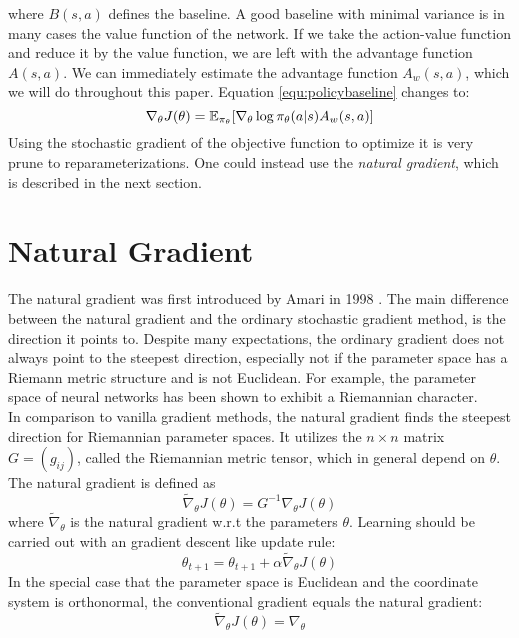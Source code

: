 where $B(s, a)$ defines the baseline. A good baseline with minimal variance is in many cases the value function of the network. If we take the action-value function and reduce it by the value function, we are left with the advantage function $A(s,a)$. We can immediately estimate the advantage function $A_w(s,a)$, which we will do throughout this paper. Equation \ref{equ:policybaseline} changes to:
\begin{equation}
	\nabla_{\theta}J(\theta)=\operatorname{\mathbb{E}}_{\pi_{\theta}}[\nabla_{\theta}\log\pi_{\theta}(a|s) A_w(s, a)]
\end{equation}
Using the stochastic gradient of the objective function to optimize it is very prune to reparameterizations. One could instead use the \textit{natural gradient}, which is described in the next section.

\section{Natural Gradient}
The natural gradient was first introduced by Amari in 1998 \cite{amari1998natural}. The main difference between the natural gradient and the ordinary stochastic gradient method, is the direction it points to. Despite many expectations, the ordinary gradient does not always point to the steepest direction, especially not if the parameter space has a Riemann metric structure and is not Euclidean. For example, the parameter space of neural networks has been shown to exhibit a Riemannian character.\\
In comparison to vanilla gradient methods, the natural gradient finds the steepest direction for Riemannian parameter spaces. It utilizes the $n \times n$ matrix $G = (g_{ij})$, called the Riemannian metric tensor, which in general depend on $\theta$. The natural gradient is defined as
\begin{equation}
	\widetilde{\nabla}_{\theta} J(\theta) = G^{-1} \nabla_\theta J(\theta)
\end{equation}
where $\widetilde{\nabla}_{\theta}$ is the natural gradient w.r.t the parameters $\theta$.  Learning should be carried out with an gradient descent like update rule:
\begin{equation}
	\theta_{t+1} = \theta_{t+1} + \alpha \widetilde{\nabla}_{\theta} J(\theta)
\end{equation}
In the special case that the parameter space is Euclidean and the coordinate system is orthonormal, the conventional gradient equals the natural gradient:
\begin{equation}
	\widetilde{\nabla}_{\theta} J(\theta) = \nabla_{\theta}
\end{equation}
